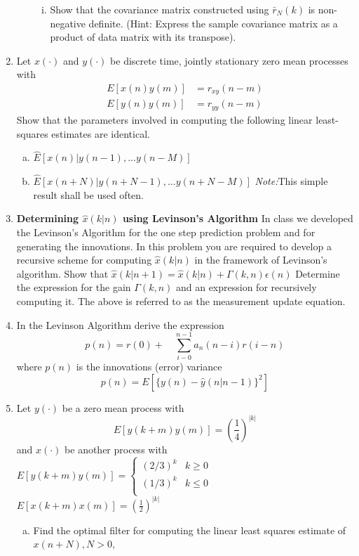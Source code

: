 \documentclass[journal,12pt,twocolumn]{IEEEtran}
\begin{document}
\begin{enumerate}[1.]
\begin{enumerate}[(a)]
\begin{enumerate}[i.]
\item Show that the covariance matrix constructed using $\bar{r}_N{(k)}$ is non-negative definite.
(Hint: Express the sample covariance matrix as a product of data matrix with its
transpose).
\end{enumerate}
\end{enumerate}
%
\item Let $x(\cdot)$ and $y(\cdot)$
be discrete time, jointly stationary zero mean processes with 
\begin{align}
E[x(n)y(m)]&=r_{xy}(n-m)
\\
E[y(n)y(m)]&=r_{yy}(n-m)
\end{align}
%
Show that the parameters involved in computing the following linear least-squares estimates are identical.
\begin{enumerate}[(a)]
\item $\hat{E}[x(n)|y(n-1),...y(n-M)]$
%
\item $\hat{E}[x(n+N)|y(n+N-1),...y(n+N-M)]$ 
%
\textit{Note:}This simple result shall be used often.
\end{enumerate}
%
%
%
\item \textbf{Determining $\hat{x}(k|n)$ using Levinson's Algorithm}
%
In class we developed the Levinson's Algorithm for the one step prediction problem and for generating the innovations. In this problem you are required to develop a recursive scheme for
computing $\hat{x}(k|n)$ in the framework of Levinson's algorithm.
Show that
%
$\hat{x}{(k|n+1)}=\hat{x}(k|n)+\Gamma(k,n)\epsilon(n)$
Determine the expression for the gain $\Gamma(k,n)$ and an expression for recursively computing it.
The above is referred to as the measurement update equation.
%
\item In the Levinson Algorithm derive the expression
$$p(n)=r(0)+\quad\sum_{i-0}^{n-1}{a_n(n-i)r(i-n)}$$
where $p(n)$ is the innovations (error) variance
$$p(n)=E[\{y(n)-\hat{y}(n|n-1)\}^2]$$
\item Let $y{(\cdot)}$ be a zero mean process with
$$E[y(k+m)y(m)]=(\frac{1}{4})^{\vert{k}\vert}$$
\medskip
and $x(\cdot)$ be another process with
%
$E[y(k+m)y(m)]=\begin{cases}
%
(2/3)^k& k \geq 0\\
(1/3)^k& k\leq 0\\
\end{cases}$
%
$E[x(k+m)x(m)]=(\frac{1}{2})^{\vert{k}\vert}$
%
\begin{enumerate}[(a)]
\item Find the optimal filter for computing the linear least squares estimate of $x(n + N ), N > 0,$

\end{enumerate}
\end{enumerate}
\end{document}
